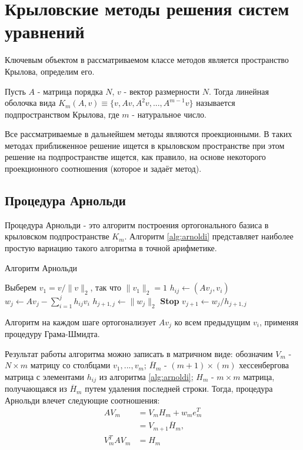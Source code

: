 \section{Крыловские методы решения систем уравнений}
\label{sec:Chapter2} 
Ключевым объектом в рассматриваемом классе методов является пространство Крылова, определим его.
\begin{definition}
    Пусть $A$ - матрица порядка $N$, $v$ - вектор размерности $N$. Тогда линейная
    оболочка вида $K_m\left(A,v\right) \equiv \{v,Av,A^2v,...,A^{m-1}v\} $ называется 
    подпространством Крылова, где $m$ - натуральное число. 
\end{definition}
Все рассматриваемые в дальнейшем методы являются проекционными.
В таких методах приближенное решение ищется в крыловском пространстве при этом 
решение на подпространстве ищется, как правило, на основе некоторого проекционного
 соотношения (которое и задаёт метод).
\subsection[Процедура Арнольди]{Процедура Арнольди \cite{Saad2003}}
Процедура Арнольди - это алгоритм построения ортогонального базиса в крыловском
подпространстве $K_m$. Алгоритм \ref{alg:arnoldi} представляет наиболее простую
вариацию такого алгоритма в точной арифметике.
\begin{algorithm}[H]
    \caption{Алгоритм Арнольди}\label{alg:arnoldi}
    \begin{algorithmic}[1]
    \State Выберем $v_1 = v / \|v\|_2$, так что $\|v_1\|_2 = 1$
    \Statex
            \State $h_{ij} \gets (Av_j, v_i)$
        \EndFor
        \State $w_j \gets Av_j - \sum_{i=1}^j h_{ij}v_i$
        \State $h_{j+1,j} \gets \|w_j\|_2$
            \State \textbf{Stop}
        \EndIf
        \State $v_{j+1} \gets w_j/h_{j+1,j}$
    \EndFor
    \end{algorithmic}
\end{algorithm}
Алгоритм на каждом шаге ортогонализует $Av_j$ ко всем предыдущим $v_i$, 
применяя процедуру Грама-Шмидта. 
\par Результат работы алгоритма можно записать в матричном
виде: обозначим $V_m$ - $N \times m$ матрицу со столбцами $v_1,...,v_m$; 
$\overline{H}_m$ - $\left(m+1\right) \times \left( m \right)$  хессенбергова матрица с 
элементами $h_{ij}$ из алгоритма \ref{alg:arnoldi}; ${H}_m$ - $ m \times m $ матрица, 
получающаяся из $\overline{H}_m$ путем удаления последней строки. Тогда, процедура Арнольди
влечет следующие соотношения:
\begin{align}
    AV_m &= V_m H_m + w_m e_m^T \\
         &= V_{m+1} \overline{H}_m,\\
    V_m^T A V_m &= H_m \label{eq:VAVHM}
\end{align} 
